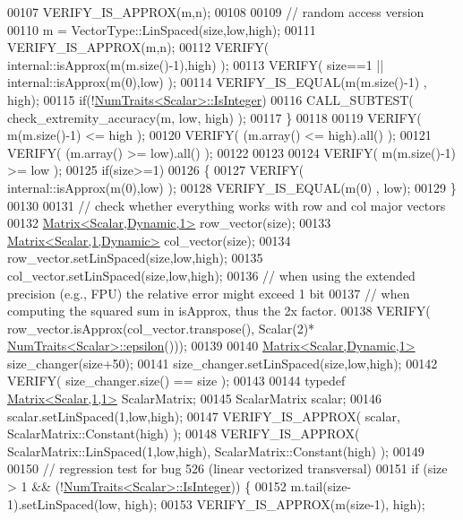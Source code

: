 \begin{DoxyCode}
00107     VERIFY\_IS\_APPROX(m,n);
00108 
00109     \textcolor{comment}{// random access version}
00110     m = VectorType::LinSpaced(size,low,high);
00111     VERIFY\_IS\_APPROX(m,n);
00112     VERIFY( internal::isApprox(m(m.size()-1),high) );
00113     VERIFY( size==1 || internal::isApprox(m(0),low) );
00114     VERIFY\_IS\_EQUAL(m(m.size()-1) , high);
00115     \textcolor{keywordflow}{if}(!\hyperlink{group___core___module_struct_eigen_1_1_num_traits}{NumTraits<Scalar>::IsInteger})
00116       CALL\_SUBTEST( check\_extremity\_accuracy(m, low, high) );
00117   \}
00118 
00119   VERIFY( m(m.size()-1) <= high );
00120   VERIFY( (m.array() <= high).all() );
00121   VERIFY( (m.array() >= low).all() );
00122 
00123 
00124   VERIFY( m(m.size()-1) >= low );
00125   \textcolor{keywordflow}{if}(size>=1)
00126   \{
00127     VERIFY( internal::isApprox(m(0),low) );
00128     VERIFY\_IS\_EQUAL(m(0) , low);
00129   \}
00130 
00131   \textcolor{comment}{// check whether everything works with row and col major vectors}
00132   \hyperlink{group___core___module}{Matrix<Scalar,Dynamic,1>} row\_vector(size);
00133   \hyperlink{group___core___module_class_eigen_1_1_matrix}{Matrix<Scalar,1,Dynamic>} col\_vector(size);
00134   row\_vector.setLinSpaced(size,low,high);
00135   col\_vector.setLinSpaced(size,low,high);
00136   \textcolor{comment}{// when using the extended precision (e.g., FPU) the relative error might exceed 1 bit}
00137   \textcolor{comment}{// when computing the squared sum in isApprox, thus the 2x factor.}
00138   VERIFY( row\_vector.isApprox(col\_vector.transpose(), Scalar(2)*
      \hyperlink{group___core___module_struct_eigen_1_1_num_traits}{NumTraits<Scalar>::epsilon}()));
00139 
00140   \hyperlink{group___core___module}{Matrix<Scalar,Dynamic,1>} size\_changer(size+50);
00141   size\_changer.setLinSpaced(size,low,high);
00142   VERIFY( size\_changer.size() == size );
00143 
00144   \textcolor{keyword}{typedef} \hyperlink{group___core___module_class_eigen_1_1_matrix}{Matrix<Scalar,1,1>} ScalarMatrix;
00145   ScalarMatrix scalar;
00146   scalar.setLinSpaced(1,low,high);
00147   VERIFY\_IS\_APPROX( scalar, ScalarMatrix::Constant(high) );
00148   VERIFY\_IS\_APPROX( ScalarMatrix::LinSpaced(1,low,high), ScalarMatrix::Constant(high) );
00149 
00150   \textcolor{comment}{// regression test for bug 526 (linear vectorized transversal)}
00151   \textcolor{keywordflow}{if} (size > 1 && (!\hyperlink{group___core___module_struct_eigen_1_1_num_traits}{NumTraits<Scalar>::IsInteger})) \{
00152     m.tail(size-1).setLinSpaced(low, high);
00153     VERIFY\_IS\_APPROX(m(size-1), high);

\end{DoxyCode}
